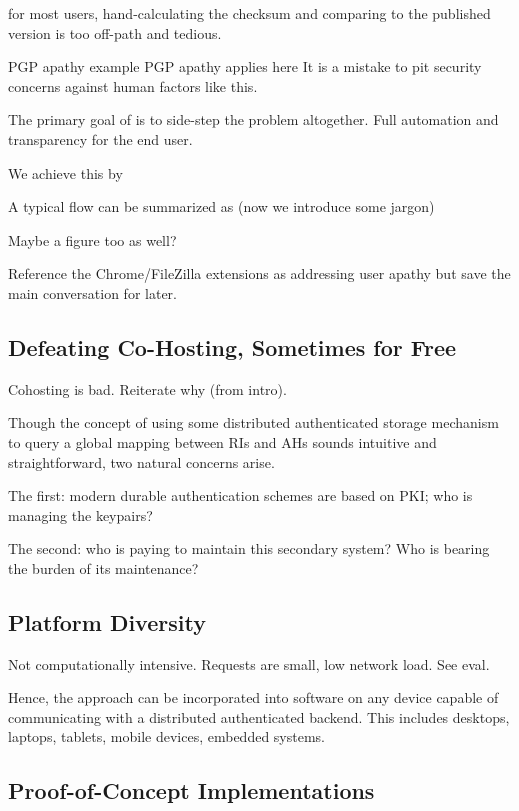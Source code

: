 for most users, hand-calculating the checksum and comparing to the published
version is too off-path and tedious.

PGP apathy example PGP apathy applies here It is a mistake to pit security
concerns against human factors like this.

The primary goal of \SYSTEM{} is to side-step the problem altogether. Full
automation and transparency for the end user.

We achieve this by

A typical flow can be summarized as (now we introduce some jargon)

Maybe a figure too as well?

Reference the Chrome/FileZilla extensions as addressing user apathy but save the main conversation for later.

\subsection{Defeating Co-Hosting, Sometimes for Free}

Cohosting is bad. Reiterate why (from intro).

Though the concept of using some distributed authenticated storage mechanism to
query a global mapping between RIs and AHs sounds intuitive and straightforward,
two natural concerns arise.

The first: modern durable authentication schemes are based on PKI; who is
managing the keypairs?

The second: who is paying to maintain this secondary system? Who is bearing the
burden of its maintenance?

\subsection{Platform Diversity}

Not computationally intensive. Requests are small, low network load. See eval.

Hence, the approach can be incorporated into software on any device capable of
communicating with a distributed authenticated backend. This includes desktops,
laptops, tablets, mobile devices, embedded systems.

\subsection{Proof-of-Concept Implementations}


